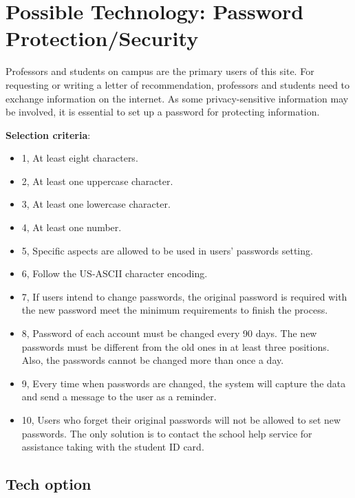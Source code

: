 \documentclass[onecolumn, draftclsnofoot,10pt, compsoc]{IEEEtran}
\begin{document}
\section{Possible Technology: Password Protection/Security}
Professors and students on campus are the primary users of this site. For requesting or writing a letter of recommendation, professors and students need to exchange information on the internet. As some privacy-sensitive information may be involved, it is essential to set up a password for protecting information. 

\textbf{Selection criteria}: \begin{itemize}
  \item 1, At least eight characters.
  \item 2, At least one uppercase character.
  \item 3, At least one lowercase character.
  \item 4, At least one number.
  \item 5, Specific aspects are allowed to be used in users’ passwords setting.
  \item 6, Follow the US-ASCII character encoding.
  \item 7, If users intend to change passwords, the original password is required with the new password meet the minimum requirements to finish the process.
  \item 8, Password of each account must be changed every 90 days. The new passwords must be different from the old ones in at least three positions. Also, the passwords cannot be changed more than once a day.  
  \item 9, Every time when passwords are changed, the system will capture the data and send a message to the user as a reminder. 
  \item 10, Users who forget their original passwords will not be allowed to set new passwords.   The only solution is to contact the school help service for assistance taking with the student ID card.
\end{itemize}

\subsection{Tech option}
\end{document}
